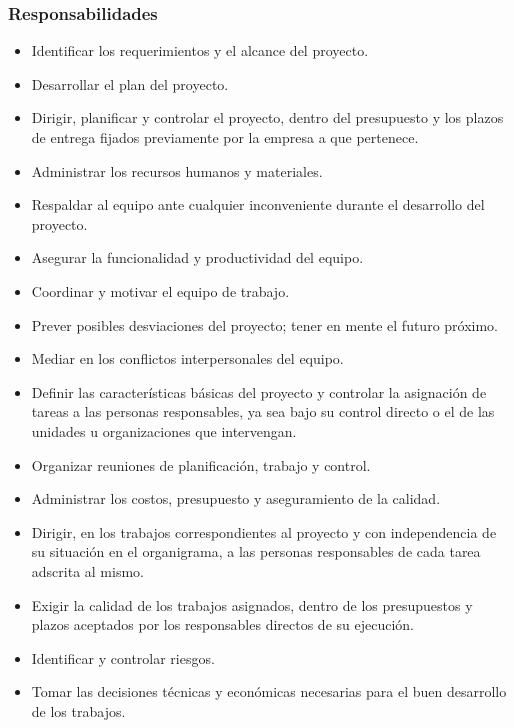         \subsubsection{Responsabilidades}
            \begin{itemize}
                \item Identificar los requerimientos y el alcance del proyecto.
                \item Desarrollar el plan del proyecto.
                \item Dirigir, planificar y controlar el proyecto, dentro del presupuesto y los plazos de entrega fijados previamente por la empresa a que pertenece.
				\item Administrar los recursos humanos y materiales.
                \item Respaldar al equipo ante cualquier inconveniente durante el desarrollo del proyecto.
                \item Asegurar la funcionalidad y productividad del equipo.
                \item Coordinar y motivar el equipo de trabajo.
                \item Prever posibles desviaciones del proyecto; tener en mente el futuro próximo.
                \item Mediar en los conflictos interpersonales del equipo.
                \item Definir las características básicas del proyecto y controlar la asignación de tareas a las personas responsables, ya sea bajo su control directo o el de las unidades u organizaciones que intervengan.
                \item Organizar reuniones de planificación, trabajo y control.
                \item Administrar los costos, presupuesto y aseguramiento de la calidad.
                \item Dirigir, en los trabajos correspondientes al proyecto y con independencia de su situación en el organigrama, a las personas responsables de cada tarea adscrita al mismo.
                \item Exigir la calidad de los trabajos asignados, dentro de los presupuestos y plazos aceptados por los responsables directos de su ejecución.
                \item Identificar y controlar riesgos.
                \item Tomar las decisiones técnicas y económicas necesarias para el buen desarrollo de los trabajos.
			\end{itemize}
             
